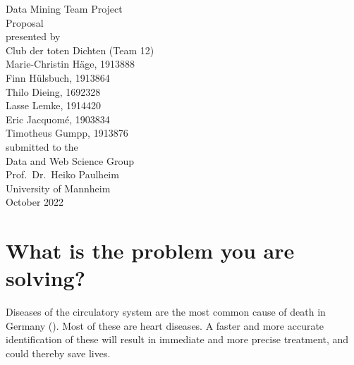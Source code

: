 \documentclass[11pt,titlepage,oneside,openany]{article}
\begin{document}
\begin{titlepage}
	\vspace*{2cm}
  \begin{center}
   {\Large Data Mining Team Project\\}
   \vspace{2cm} 
   {Proposal\\}
   \vspace{2cm}
   {presented by\\
   	Club der toten Dichten (Team 12)\\
    Marie-Christin Häge, 1913888 \\
    Finn Hülsbuch, 1913864 \\
    Thilo Dieing, 1692328 \\
    Lasse Lemke, 1914420 \\
    Eric Jacquomé, 1903834 \\
    Timotheus Gumpp, 1913876 \\
   }
   \vspace{1cm} 
   {submitted to the\\
    Data and Web Science Group\\
    Prof.\ Dr.\ Heiko Paulheim\\
    University of Mannheim\\} \vspace{2cm}
   {October 2022}
  \end{center}
\end{titlepage} 






\newpage





\section{What is the problem you are solving?}
\label{sec:problem}

Diseases of the circulatory system are the most common cause of death in Germany (\cite{statistischesbundesamt2022}).
Most of these are heart diseases. A faster and more accurate identification of these will result in immediate and more precise treatment, and could thereby save lives.
\end{document}

